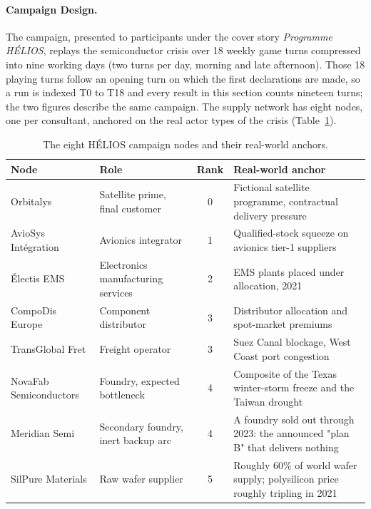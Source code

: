 \paragraph{Campaign Design.}
The campaign, presented to participants under the cover story \emph{Programme HÉLIOS}, replays the semiconductor crisis over 18 weekly game turns compressed into nine working days (two turns per day, morning and late afternoon). Those 18 playing turns follow an opening turn on which the first declarations are made, so a run is indexed T0 to T18 and every result in this section counts nineteen turns; the two figures describe the same campaign. The supply network has eight nodes, one per consultant, anchored on the real actor types of the crisis (Table~\ref{tab:helios_network}).

\begin{table}[H]
\centering
\caption{The eight HÉLIOS campaign nodes and their real-world anchors.}
\label{tab:helios_network}
\small
\begin{tabularx}{\linewidth}{>{\raggedright\arraybackslash}p{3.1cm} >{\raggedright\arraybackslash}p{2.6cm} c X}
\toprule
\textbf{Node} & \textbf{Role} & \textbf{Rank} & \textbf{Real-world anchor} \\
\midrule
Orbitalys & Satellite prime, final customer & 0 & Fictional satellite programme, contractual delivery pressure \\
AvioSys Int\'egration & Avionics integrator & 1 & Qualified-stock squeeze on avionics tier-1 suppliers \\
\'Electis EMS & Electronics manufacturing services & 2 & EMS plants placed under allocation, 2021 \\
CompoDis Europe & Component distributor & 3 & Distributor allocation and spot-market premiums \\
TransGlobal Fret & Freight operator & 3 & Suez Canal blockage, West Coast port congestion \\
NovaFab Semiconductors & Foundry, expected bottleneck & 4 & Composite of the Texas winter-storm freeze and the Taiwan drought \\
Meridian Semi & Secondary foundry, inert backup arc & 4 & A foundry sold out through 2023: the announced "plan B" that delivers nothing \\
SilPure Materials & Raw wafer supplier & 5 & Roughly 60\% of world wafer supply; polysilicon price roughly tripling in 2021 \\
\bottomrule
\end{tabularx}
\end{table}

